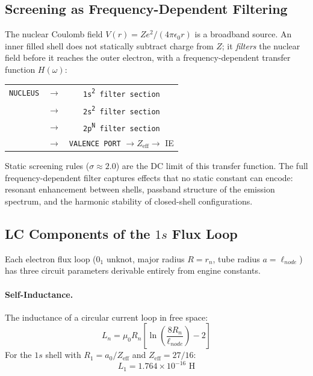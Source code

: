 \subsection{Screening as Frequency-Dependent Filtering}

The nuclear Coulomb field $V(r) = Ze^2/(4\pi\epsilon_0 r)$ is a broadband source. An inner filled shell does not statically subtract charge from $Z$; it \emph{filters} the nuclear field before it reaches the outer electron, with a frequency-dependent transfer function $H(\omega)$:

\begin{center}
\small
\begin{tabular}{ccc}
\texttt{NUCLEUS} & $\longrightarrow$ & \texttt{1s\textsuperscript{2} filter section} \\
& $\longrightarrow$ & \texttt{2s\textsuperscript{2} filter section} \\
& $\longrightarrow$ & \texttt{2p\textsuperscript{N} filter section} \\
& $\longrightarrow$ & \texttt{VALENCE PORT} $\rightarrow Z_\text{eff} \rightarrow$ IE
\end{tabular}
\end{center}

Static screening rules ($\sigma \approx 2.0$) are the DC limit of this transfer function. The full frequency-dependent filter captures effects that no static constant can encode: resonant enhancement between shells, passband structure of the emission spectrum, and the harmonic stability of closed-shell configurations.

\subsection{LC Components of the $1s$ Flux Loop}

Each electron flux loop ($0_1$ unknot, major radius $R = r_n$, tube radius $a = \ell_{node}$) has three circuit parameters derivable entirely from engine constants.

\paragraph{Self-Inductance.} The inductance of a circular current loop in free space:
\begin{equation}
    L_n = \mu_0 R_n \left[\ln\!\left(\frac{8R_n}{\ell_{node}}\right) - 2\right]
\end{equation}
For the $1s$ shell with $R_1 = a_0/Z_\text{eff}$ and $Z_\text{eff} = 27/16$:
\begin{equation}
    L_1 = 1.764 \times 10^{-16} \text{ H}
\end{equation}


